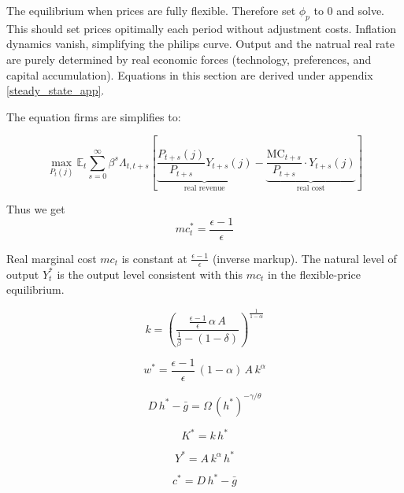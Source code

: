 \documentclass[11pt,preprint]{elsarticle}
\numberwithin{equation}{section}
\numberwithin{figure}{section}
\numberwithin{table}{section}
\begin{document}
The equilibrium when prices are fully flexible. Therefore set \(\phi_p\)
to 0 and solve. This should set prices opitimally each period without
adjustment costs. Inflation dynamics vanish, simplifying the philips
curve. Output and the natrual real rate are purely determined by real
economic forces (technology, preferences, and capital accumulation).
Equations in this section are derived under appendix
\ref{steady_state_app}.

The equation firms are simplifies to:

\begin{equation}
\max_{P_t(j)} \mathbb{E}_t \sum_{s=0}^{\infty} \beta^s \Lambda_{t,t+s} \left[
\underbrace{\frac{P_{t+s}(j)}{P_{t+s}} Y_{t+s}(j)}_{\text{real revenue}} 
- \underbrace{\frac{\text{MC}_{t+s}}{P_{t+s}} \cdot Y_{t+s}(j)}_{\text{real cost}} 
\right]
\label{intermediate_objective_frictionless}
\end{equation}

Thus we get \begin{equation}
mc^*_t = \frac{\epsilon - 1}{\epsilon}
\end{equation}

Real marginal cost \(mc_t\) is constant at
\(\frac{\epsilon - 1}{\epsilon}\) (inverse markup). The natural level of
output \(Y_t^*\) is the output level consistent with this \(mc_t\) in
the flexible-price equilibrium.

\begin{equation}\label{eq:k_ss}
k = \left(\frac{\tfrac{\epsilon-1}{\epsilon}\,\alpha\,A}{\tfrac{1}{\beta} - (1-\delta)}\right)^{\!\frac{1}{1-\alpha}}
\end{equation}

\begin{equation}\label{eq:w_ss}
w^* = \frac{\epsilon-1}{\epsilon}\,(1-\alpha)\,A\,k^\alpha
\end{equation}

\begin{equation}\label{eq:h_ss}
D\,h^* - \bar{g} = \Omega\,(h^*)^{-\gamma/\theta}
\end{equation}

\begin{equation}\label{eq:K_ss}
K^* = k\,h^*
\end{equation}

\begin{equation}\label{eq:Y_ss}
Y^* = A\,k^\alpha\,h^*
\end{equation}

\begin{equation}\label{eq:c_ss}
c^* = D\,h^* - \bar{g}
\end{equation}
\end{document}
